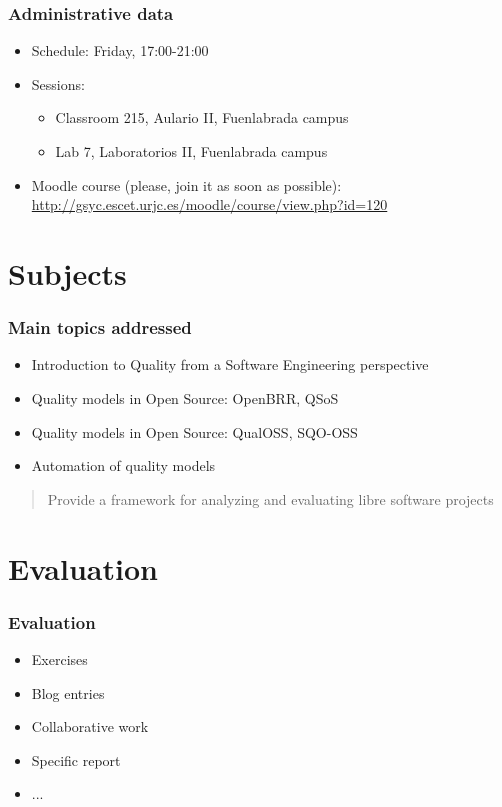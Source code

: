 \documentclass{beamer}
\begin{document}
\begin{frame}
\frametitle{Administrative data}

\begin{itemize}
\item Schedule: Friday, 17:00-21:00
\item Sessions:
  \begin{itemize}
  \item Classroom 215, Aulario II, Fuenlabrada campus
  \item Lab 7, Laboratorios II, Fuenlabrada campus
  \end{itemize}
\item Moodle course (please, join it as soon as possible): \\
  \url{http://gsyc.escet.urjc.es/moodle/course/view.php?id=120}
\end{itemize}
\end{frame}

\section{Subjects}

\begin{frame}
\frametitle{Main topics addressed}

\begin{itemize}
\item Introduction to Quality from a Software Engineering perspective
\item Quality models in Open Source: OpenBRR, QSoS
\item Quality models in Open Source: QualOSS, SQO-OSS
\item Automation of quality models
\end{itemize}

\begin{quote}
\begin{center}
Provide a framework for analyzing and evaluating libre software projects
\end{center}
\end{quote}

\end{frame}

\section{Evaluation}


\begin{frame}
\frametitle{Evaluation}

\begin{itemize}
\item Exercises
\item Blog entries
\item Collaborative work
\item Specific report
\item ...
\end{itemize}

\end{frame}
\end{document}
